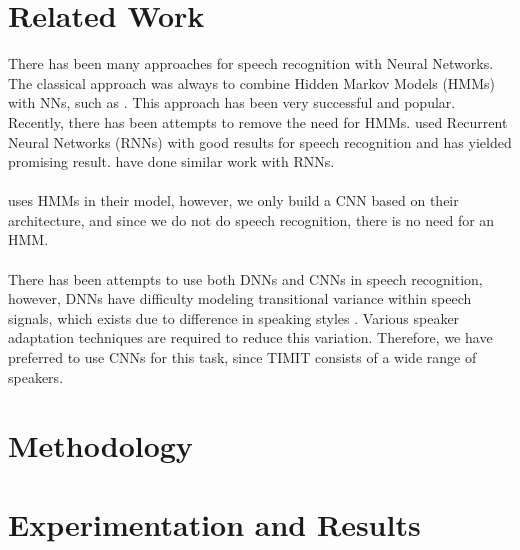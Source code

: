 \documentclass[a4paper,12pt]{article}
\begin{document}
\section{Related Work}
There has been many approaches for speech recognition with Neural Networks. The classical approach was always to combine Hidden Markov Models (HMMs) with NNs, such as \cite{robinson1994application}. This approach has been very successful and popular. Recently, there has been attempts to remove the need for HMMs. \cite{graves2013speech} used Recurrent Neural Networks (RNNs) with good results for speech recognition and has yielded promising result. \cite{graves2014towards} have done similar work with RNNs.\\\\
\cite{sainath2013deep} uses HMMs in their model, however, we only build a CNN based on their architecture, and since we do not do speech recognition, there is no need for an HMM.\\\\
There has been attempts to use both DNNs and CNNs in speech recognition, however, DNNs have difficulty modeling transitional variance within speech signals, which exists due to difference in speaking styles \cite{lecun1995convolutional}. Various speaker adaptation techniques are required to reduce this variation. Therefore, we have preferred to use CNNs for this task, since TIMIT consists of a wide range of speakers.

\section{Methodology}


\section{Experimentation and Results}




\end{document}

